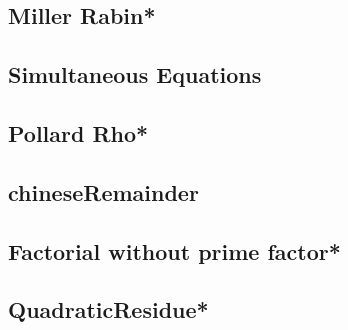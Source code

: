 \subsection{Miller Rabin*} %

% 
% 
\subsection{Simultaneous Equations}

\subsection{Pollard Rho*} %

% 
% 
% 
\subsection{chineseRemainder}

\subsection{Factorial without prime factor*} %

\subsection{QuadraticResidue*} %

